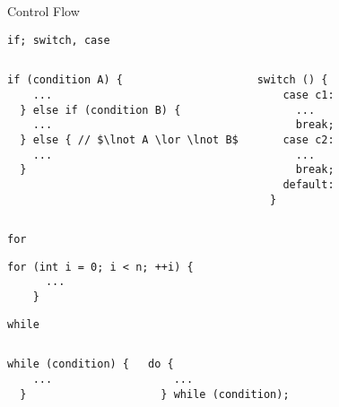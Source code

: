 \begin{frame}{}
  \centerline{\LARGE Control Flow}
\end{frame}

\begin{frame}[fragile]{\texttt{if; switch, case}}
  \begin{columns}
      \begin{lstlisting}[style = Cstyle]
  if (condition A) {
    ...
  } else if (condition B) {
    ...
  } else { // $\lnot A \lor \lnot B$
    ...
  }
      \end{lstlisting}
      \begin{lstlisting}[style = Cstyle]
  switch () {
    case c1:
      ...
      break;
    case c2:
      ...
      break;
    default:
  }
      \end{lstlisting}
  \end{columns}
\end{frame}

\begin{frame}[fragile]{\texttt{for}}
  \begin{lstlisting}[style = Cstyle]
    for (int i = 0; i < n; ++i) {
      ...
    }
  \end{lstlisting}
\end{frame}

\begin{frame}[fragile]{\texttt{while}}
  \begin{columns}
      \begin{lstlisting}[style = Cstyle]
  while (condition) {
    ...
  }
      \end{lstlisting}
      \begin{lstlisting}[style = Cstyle]
  do {
    ...
  } while (condition);
      \end{lstlisting}
  \end{columns}
\end{frame}

